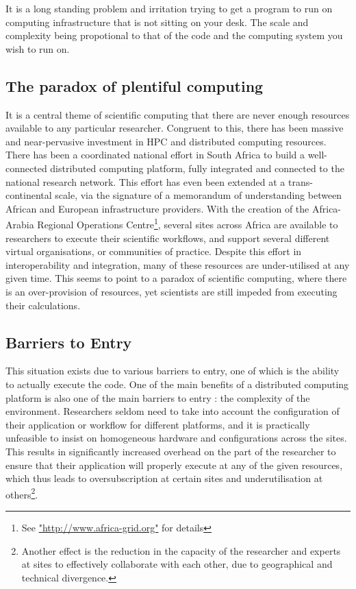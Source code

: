 \documentclass[a4paper]{jpconf}
\begin{document}
    It is a long standing problem and irritation trying to get a program to run on
    computing infrastructure that is not sitting on your desk. The scale and complexity being 
    propotional to that of the code and the computing system you wish to run on.

	\subsection{The paradox of  plentiful computing}

    It is a central theme of scientific computing that there are never enough resources available to
    any particular researcher. Congruent to this, there has
    been massive and near-pervasive investment in HPC and distributed computing resources. There has
    been a coordinated national effort in South Africa to build a well-connected distributed computing
    platform\cite{SAGrid}, fully integrated and connected to the national research
    network\cite{SANREN}. This effort has even been extended at a trans-continental scale, via the
    signature of a memorandum of understanding between African and European infrastructure
    providers\cite{AAROC}. With the creation of the Africa-Arabia Regional Operations
    Centre\footnote{See \url{"http://www.africa-grid.org"} for details}, several sites across Africa
    are available to researchers to execute their scientific workflows, and support several
    different virtual organisations, or communities of practice. Despite this effort in
    interoperability and integration, many of these resources are under-utilised at any given time.
    This seems to point to a paradox of scientific computing, where there is an over-provision of
    resources, yet scientists are still impeded from executing their calculations.

	\subsection{Barriers to Entry}

    This situation exists due to various barriers to entry, one of which is the ability
    to actually execute the code. One of the main benefits of a distributed computing
    platform is also one of the main barriers to entry : the complexity of the environment.
    Researchers seldom need to take into account the configuration of their application or workflow
    for different platforms, and it is practically unfeasible to insist on homogeneous hardware and
    configurations across the sites. This results in significantly increased overhead on the part of
    the researcher to ensure that their application will properly execute at any of the given
    resources, which thus leads to oversubscription at certain sites and underutilisation at
    others\footnote{Another effect is the reduction in the capacity of the researcher and experts at
    sites to effectively collaborate with each other, due to geographical and technical
    divergence.}.
\end{document}
